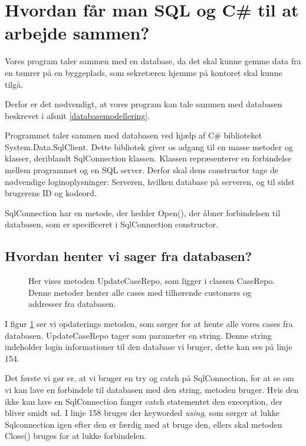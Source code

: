 \section{Hvordan får man SQL og C\# til at arbejde sammen?}\label{arkitektur}

Vores program taler sammen med en database, da det skal kunne gemme data fra en tømrer på en byggeplads, som sekretæren hjemme på kontoret skal kunne tilgå.

Derfor er det nødvendigt, at vores program kan tale sammen med databasen beskrevet i afsnit \ref{databasemodellering}.

Programmet taler sammen med databasen ved hjælp af C\# biblioteket System.Data.SqlClient.\cite{sqlclient}
Dette bibliotek giver os adgang til en masse metoder og klasser, deriblandt SqlConnection klassen.
Klassen repræsenterer en forbindelse mellem programmet og en SQL server.
Derfor skal dens constructor tage de nødvendige loginoplysninger: Serveren, hvilken database på serveren, og til sidst brugerens ID og kodeord.

SqlConnection har en metode, der hedder Open(), der åbner forbindelsen til databasen, som er specificeret i SqlConnection constructor.

\subsection{Hvordan henter vi sager fra databasen?}

\begin{figure}[H]
    \caption{Her vises metoden UpdateCaseRepo, som ligger i classen CaseRepo. Denne metoder henter alle cases med tilhørende customers og addresser fra databasen.}
    \label{fig:UpdateCaseRepo}
\end{figure}

I figur \ref{fig:UpdateCaseRepo} ser vi opdaterings metoden, som sørger for at hente alle vores cases fra databasen.
UpdateCaseRepo tager som parameter en string.
Denne string indeholder login informationer til den database vi bruger, dette kan ses på linje 154.

Det første vi gør er, at vi bruger en try og catch på SqlConnection, for at se om vi kan lave en forbindele til databasen med den string, metoden bruger.
Hvis den ikke kan lave en SqlConnection fanger catch statementet den exeception, der bliver smidt ud.
I linje 158 bruges der keyworded \textit{using}, som sørger at lukke Sqlconnection igen efter den er færdig med at bruge den, ellers skal metoden Close() bruges for at lukke forbindelen.

